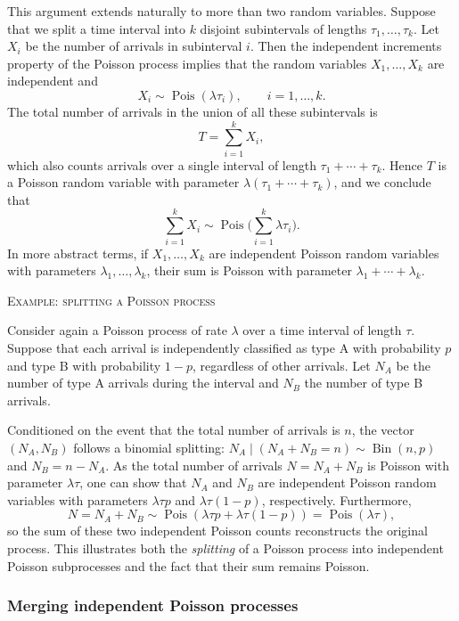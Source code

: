 This argument extends naturally to more than two random variables.  
Suppose that we split a time interval into \(k\) disjoint subintervals of lengths \(\tau_1, \dots, \tau_k\).  
Let \(X_i\) be the number of arrivals in subinterval \(i\).  
Then the independent increments property of the Poisson process implies that the random variables \(X_1, \dots, X_k\) are independent and
\[
X_i \sim \operatorname{Pois}(\lambda \tau_i),
\qquad i = 1, \dots, k.
\]
The total number of arrivals in the union of all these subintervals is
\[
T = \sum_{i=1}^{k} X_i,
\]
which also counts arrivals over a single interval of length \(\tau_1 + \cdots + \tau_k\).  
Hence \(T\) is a Poisson random variable with parameter \(\lambda (\tau_1 + \cdots + \tau_k)\), and we conclude that
\[
\sum_{i=1}^{k} X_i \sim \operatorname{Pois}\Big(\sum_{i=1}^{k} \lambda \tau_i\Big).
\]
In more abstract terms, if \(X_1, \dots, X_k\) are independent Poisson random variables with parameters \(\lambda_1, \dots, \lambda_k\), their sum is Poisson with parameter \(\lambda_1 + \cdots + \lambda_k\).  

\bigskip
\textsc{Example: splitting a Poisson process}

Consider again a Poisson process of rate \(\lambda\) over a time interval of length \(\tau\).  
Suppose that each arrival is independently classified as type A with probability \(p\) and type B with probability \(1-p\), regardless of other arrivals.  
Let \(N_A\) be the number of type A arrivals during the interval and \(N_B\) the number of type B arrivals.  

Conditioned on the event that the total number of arrivals is \(n\), the vector \((N_A, N_B)\) follows a binomial splitting: \(N_A \mid (N_A + N_B = n) \sim \operatorname{Bin}(n, p)\) and \(N_B = n - N_A\).  
As the total number of arrivals \(N = N_A + N_B\) is Poisson with parameter \(\lambda \tau\), one can show that \(N_A\) and \(N_B\) are independent Poisson random variables with parameters \(\lambda \tau p\) and \(\lambda \tau (1-p)\), respectively.  
Furthermore,
\[
N = N_A + N_B \sim \operatorname{Pois}(\lambda \tau p + \lambda \tau (1-p)) = \operatorname{Pois}(\lambda \tau),
\]
so the sum of these two independent Poisson counts reconstructs the original process.  
This illustrates both the \textit{splitting} of a Poisson process into independent Poisson subprocesses and the fact that their sum remains Poisson.

\subsubsection{Merging independent Poisson processes}

